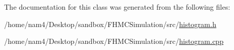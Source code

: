 The documentation for this class was generated from the following files\-:\begin{DoxyCompactItemize}
\item 
/home/nam4/\-Desktop/sandbox/\-F\-H\-M\-C\-Simulation/src/\hyperlink{histogram_8h}{histogram.\-h}\item 
/home/nam4/\-Desktop/sandbox/\-F\-H\-M\-C\-Simulation/src/\hyperlink{histogram_8cpp}{histogram.\-cpp}\end{DoxyCompactItemize}
